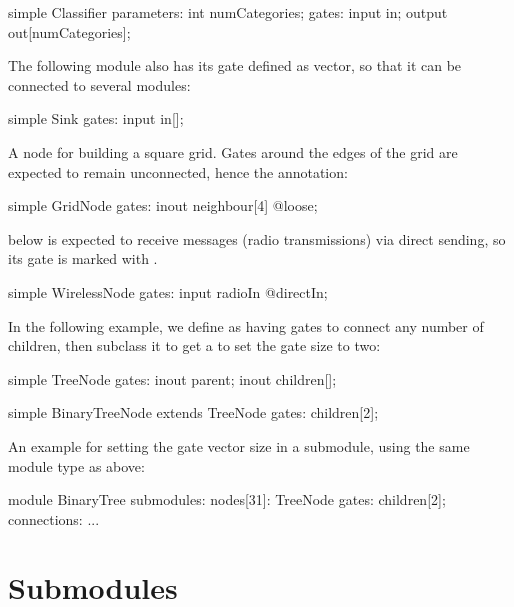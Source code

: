 \begin{ned}
simple Classifier {
    parameters:
        int numCategories;
    gates:
        input in;
        output out[numCategories];
}
\end{ned}

The following  module also has its  gate defined
as vector, so that it can be connected to several modules:

\begin{ned}
simple Sink {
    gates:
        input in[];
}
\end{ned}

A node for building a square grid. Gates around the edges of the grid are
expected to remain unconnected, hence the  annotation:

\begin{ned}
simple GridNode {
    gates:
        inout neighbour[4] @loose;
}
\end{ned}

 below is expected to receive messages (radio transmissions)
via direct sending, so its  gate is marked with .

\begin{ned}
simple WirelessNode {
    gates:
        input radioIn @directIn;
}
\end{ned}

In the following example, we define  as having gates to connect
any number of children, then subclass it to get a  to
set the gate size to two:

\begin{ned}
simple TreeNode {
    gates:
        inout parent;
        inout children[];
}

simple BinaryTreeNode extends TreeNode {
    gates:
        children[2];
}
\end{ned}

An example for setting the gate vector size in a submodule, using the same
 module type as above:

\begin{ned}
module BinaryTree {
    submodules:
        nodes[31]: TreeNode {
            gates:
                children[2];
        }
    connections:
        ...
}
\end{ned}



\section{Submodules}
\label{sec:ch-ned-lang:submodules}

